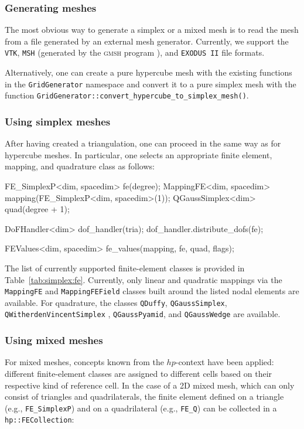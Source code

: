 \documentclass{ansarticle-preprint}
\begin{document}
\subsubsection{Generating meshes}

The most obvious way to generate a simplex or a mixed mesh is to read the mesh from a file
generated by an external mesh generator. Currently, we support the
\texttt{VTK}, \texttt{MSH} (generated by the \textsc{gmsh} program \cite{geuzaine2009gmsh}), and \texttt{EXODUS II} file formats.

Alternatively, one can create a pure hypercube mesh with the existing functions
in the \texttt{GridGenerator} namespace and convert it to a
pure simplex mesh with the function
\texttt{GridGenerator::convert\_\allowbreak hypercube\_\allowbreak to\_\allowbreak simplex\_\allowbreak mesh()}.

\subsubsection{Using simplex meshes}

After having created a triangulation, one can proceed in the same way
as for hypercube meshes. In particular, one selects an appropriate finite element, mapping, and
quadrature class as follows:

\begin{c++}
FE_SimplexP<dim, spacedim> fe(degree);
MappingFE<dim, spacedim> mapping(FE_SimplexP<dim, spacedim>(1));
QGaussSimplex<dim> quad(degree + 1);

DoFHandler<dim> dof_handler(tria);
dof_handler.distribute_dofs(fe);

FEValues<dim, spacedim> fe_values(mapping, fe, quad, flags);
\end{c++}
The  list of currently supported finite-element classes is provided in Table~\ref{tab:simplex:fe}. Currently,
only linear and quadratic mappings via the \texttt{MappingFE} and
\texttt{MappingFEField} classes built around the listed nodal elements are available.
For quadrature, the classes \texttt{QDuffy}, \texttt{QGaussSimplex}, \texttt{QWitherdenVincentSimplex} \cite{schloemer21, witherden2015identification},
\texttt{QGaussPyamid}, and \texttt{QGaussWedge} are
available.

\subsubsection{Using mixed meshes}
For mixed meshes, concepts known from the $hp$-context have been applied:
 different finite-element classes are assigned to different cells
 based on their respective kind of reference cell. In the
case of a 2D mixed mesh, which can only consist of triangles and
quadrilaterals, the finite element defined on a triangle (e.g., \texttt{FE\_SimplexP})
and on a quadrilateral (e.g., \texttt{FE\_Q}) can be collected in a \texttt{hp::FECollection}:
\end{document}
